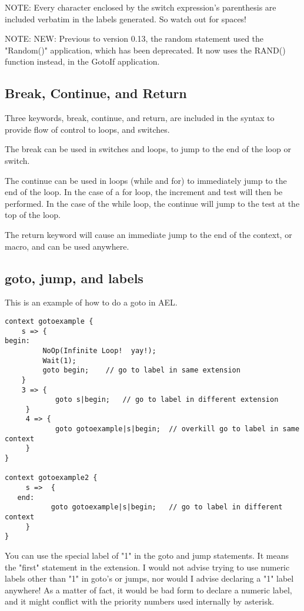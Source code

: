{NOTE: Every character enclosed by the switch expression's parenthesis
      are included verbatim in the labels generated. So watch out for
      spaces!

NOTE: NEW: Previous to version 0.13, the random statement used the
      "Random()" application, which has been deprecated. It now uses
      the RAND() function instead, in the GotoIf application.


\subsection{Break, Continue, and Return}

Three keywords, break, continue, and return, are included in the
syntax to provide flow of control to loops, and switches.

The break can be used in switches and loops, to jump to the end of the
loop or switch.

The continue can be used in loops (while and for) to immediately jump
to the end of the loop. In the case of a for loop, the increment and
test will then be performed. In the case of the while loop, the
continue will jump to the test at the top of the loop.

The return keyword will cause an immediate jump to the end of the
context, or macro, and can be used anywhere.



\subsection{goto, jump, and labels}

This is an example of how to do a goto in AEL.

\begin{verbatim}
context gotoexample {
    s => {
begin:
         NoOp(Infinite Loop!  yay!);
         Wait(1);
         goto begin;    // go to label in same extension
    }
    3 => {
            goto s|begin;   // go to label in different extension
     }
     4 => {
            goto gotoexample|s|begin;  // overkill go to label in same context
     }
}

context gotoexample2 {
     s =>  {
   end: 
           goto gotoexample|s|begin;   // go to label in different context
     }
}
\end{verbatim}

You can use the special label of "1" in the goto and jump
statements. It means the "first" statement in the extension. I would
not advise trying to use numeric labels other than "1" in goto's or
jumps, nor would I advise declaring a "1" label anywhere! As a matter
of fact, it would be bad form to declare a numeric label, and it might
conflict with the priority numbers used internally by asterisk.

}
